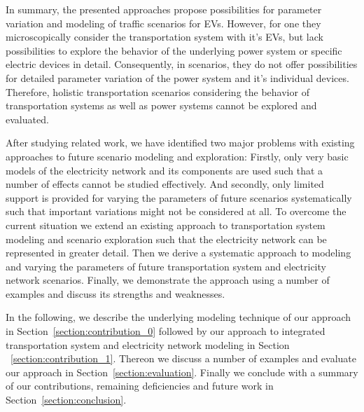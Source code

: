 In summary, the presented approaches propose possibilities for parameter variation and modeling of traffic scenarios for EVs. However, for one they microscopically consider the transportation system with it's EVs, but lack possibilities to explore the behavior of the underlying power system or specific electric devices in detail. Consequently, in scenarios, they do not offer possibilities for detailed parameter variation of the power system and it's individual devices. Therefore, holistic transportation scenarios considering the behavior of transportation systems as well as power systems cannot be explored and evaluated.

After studying related work, we have identified two major problems with existing approaches to future scenario modeling and exploration: Firstly, only very basic models of the electricity network and its components are used such that a number of effects cannot be studied effectively. And secondly, only limited support is provided for varying the parameters of future scenarios systematically such that important variations might not be considered at all.
To overcome the current situation we extend an existing approach to transportation system modeling and scenario exploration such that the electricity network can be represented in greater detail. Then we derive a systematic approach to modeling and varying the parameters of future transportation system and electricity network scenarios. Finally, we demonstrate the approach using a number of examples and discuss its strengths and weaknesses.


In the following, we describe the underlying modeling technique of our approach in Section~\ref{section:contribution_0} followed by our approach to integrated transportation system and electricity network modeling in Section ~\ref{section:contribution_1}. Thereon we discuss a number of examples and evaluate our approach in Section~\ref{section:evaluation}. Finally we conclude with a summary of our contributions, remaining deficiencies and future work in Section~\ref{section:conclusion}.